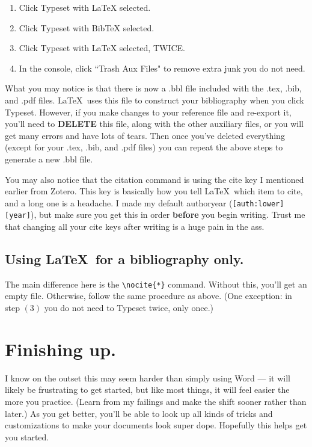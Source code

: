 \documentclass[11pt]{article}
\begin{document}
\begin{enumerate}
\item{Click Typeset with LaTeX selected.}
\item{Click Typeset with BibTeX selected.}
\item{Click Typeset with LaTeX selected, TWICE.}
\item{In the console, click ``Trash Aux Files" to remove extra junk you do not need.}
\end{enumerate}

What you may notice is that there is now a .bbl file included with the .tex, .bib, and .pdf files. \LaTeX\ uses this file to construct your bibliography when you click Typeset. However, if you make changes to your reference file and re-export it, you'll need to \textbf{DELETE} this file, along with the other auxiliary files, or you will get many errors and have lots of tears. Then once you've deleted everything (except for your .tex, .bib, and .pdf files) you can repeat the above steps to generate a new .bbl file.

You may also notice that the citation command is using the cite key I mentioned earlier from Zotero. This key is basically how you tell \LaTeX\ which item to cite, and a long one is a headache. I made my default authoryear (\verb|[auth:lower][year]|), but make sure you get this in order \textbf{before} you begin writing. Trust me that changing all your cite keys after writing is a huge pain in the ass.

\subsection{Using \LaTeX\ for a bibliography only.}

The main difference here is the \verb|\nocite{*}| command. Without this, you'll get an empty file. Otherwise, follow the same procedure as above. (One exception: in step $(3)$ you do not need to Typeset twice, only once.)

\section{Finishing up.}

I know on the outset this may seem harder than simply using Word --- it will likely be frustrating to get started, but like most things, it will feel easier the more you practice. (Learn from my failings and make the shift sooner rather than later.) As you get better, you'll be able to look up all kinds of tricks and customizations to make your documents look super dope. Hopefully this helps get you started.
\end{document}
